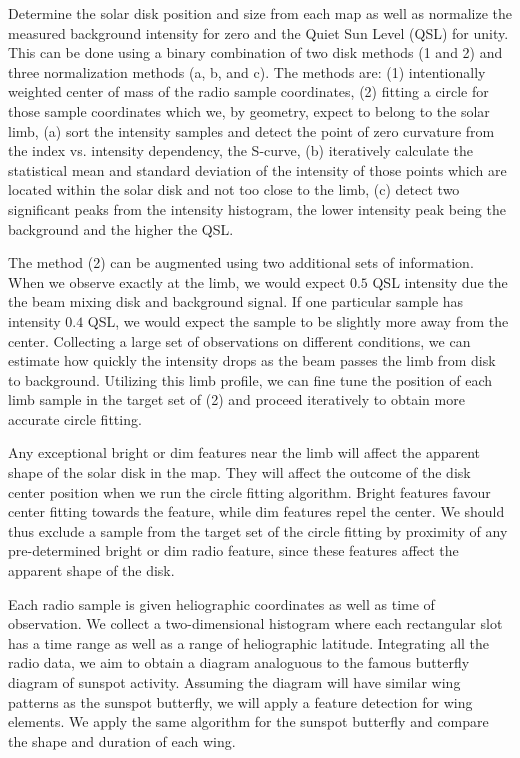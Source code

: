 \documentclass{aa}
\begin{document}
  {
    Determine the solar disk position and size from each map as well as
    normalize the measured background intensity for zero and the Quiet Sun
    Level (QSL) for unity.
    This can be done using a binary combination of two disk methods (1 and 
    2) and three normalization methods (a, b, and c).
    The methods are: (1) intentionally weighted center of mass of the radio
    sample coordinates, (2) fitting a circle for those sample coordinates
    which we, by geometry, expect to belong to the solar limb, (a) sort the
    intensity samples and detect the point of zero curvature from the index vs.     intensity dependency, the S-curve, (b) iteratively calculate the
    statistical mean and standard deviation of the intensity of 
    those points which are located within the solar disk and not too close
    to the limb, (c) detect two significant peaks from the intensity histogram,
    the lower intensity peak being the background and the higher the QSL.

    The method (2) can be augmented using two additional sets of information.
    When we observe exactly at the limb, we would expect $0.5$ QSL intensity
    due the the beam mixing disk and background signal.
    If one particular sample has intensity $0.4$ QSL, we would expect the
    sample to be slightly more away from the center.
    Collecting a large set of observations on different conditions, we can
    estimate how quickly the intensity drops as the beam passes the limb 
    from disk to background.
    Utilizing this limb profile, we can fine tune the position of each limb
    sample in the target set of (2) and proceed iteratively to obtain more
    accurate circle fitting.

    Any exceptional bright or dim features near the limb will affect the
    apparent shape of the solar disk in the map. 
    They will affect the outcome of the disk center position when we run the
    circle fitting algorithm.
    Bright features favour center fitting towards the feature,
    while dim features repel the center.
    We should thus exclude a sample from the target set of the circle fitting
    by proximity of any pre-determined bright or dim radio feature, since these
    features affect the apparent shape of the disk.
   
    Each radio sample is given heliographic coordinates as well as time of
    observation.
    We collect a two-dimensional histogram where each rectangular slot has a
    time range as well as a range of heliographic latitude.
    Integrating all the radio data, we aim to obtain a diagram analoguous to
    the famous butterfly diagram of sunspot activity.
    Assuming the diagram will have similar wing patterns as the sunspot
    butterfly, we will apply a feature detection for wing elements.
    We apply the same algorithm for the sunspot butterfly and compare the shape
    and duration of each wing.
  }
\end{document}
